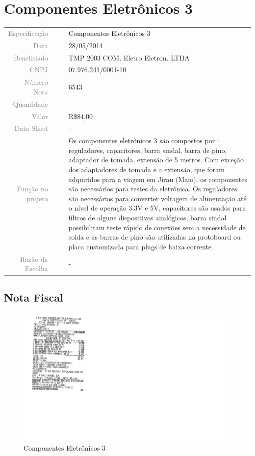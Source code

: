 

\section{Componentes Eletrônicos 3}
\label{componentes_3}


\begin{table}[ht!]

	\begin{tabular}{r l|l p{12cm} }
		
		\textcolor{gray}{Especificação} &&& 	{Componentes Eletrônicos 3}\\
		\textcolor{gray}{Data} &&& 				{28/05/2014}\\
        \textcolor{gray}{Beneficiado} &&&		{TMP 2003 COM. Eletro Eletron. LTDA}
        \\
        \textcolor{gray}{CNPJ} &&& 				{07.976.241/0001-10} \\
        \textcolor{gray}{Número Nota} &&& 		{6543} \\
		\textcolor{gray}{Quantidade} &&& 		{-} \\
		\textcolor{gray}{Valor} &&& 			{R\$84,00} \\
		\textcolor{gray}{Data Sheet} &&& 		{-} \\

		\textcolor{gray}{Função no projeto} &&& {Os componentes eletrônicos 3 são
		compostos por : reguladores, capacitores, barra sindal, barra de pino,
		adaptador de tomada, extensão de 5 metros. Com exceção dos adaptadores de
		tomada e a extensão, que foram adquiridos para a viagem em Jirau (Maio), os
		componentes são necessários para testes da eletrônica. Os reguladores são
		necessários para converter voltagem de alimentação até o nível de operação
		3.3V e 5V, capacitores são usados para filtros de alguns
		dispositivos analógicos, barra sindal possibilitam teste rápido de conexões
		sem a necessidade de solda e as barras de pino são utilizadas na protoboard ou
		placa customizada para plugs de baixa corrente.}
		\\
		\textcolor{gray}{Razão da Escolha} &&& {-}

	\end{tabular}
\end{table}

\newpage


\subsection{Nota Fiscal}
\begin{figure}[H]
 \centering
 \includegraphics[width=1\columnwidth]{Componentes_Eletronicos_3/nota_eletronica3.png}
 \caption{Componentes Eletrônicos 3}
 \end{figure}